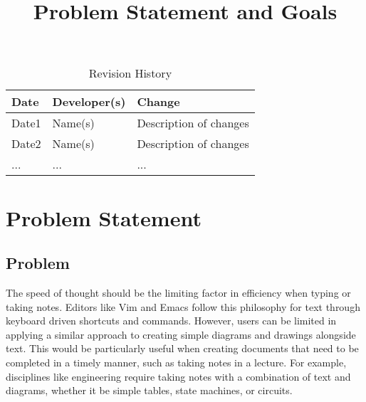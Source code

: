 \documentclass{article}
\title{Problem Statement and Goals\\\progname}
\author{\authname}
\date{}
\begin{document}
\maketitle

\begin{table}[hp]
\caption{Revision History} \label{TblRevisionHistory}
\begin{tabularx}{\textwidth}{llX}
\toprule
\textbf{Date} & \textbf{Developer(s)} & \textbf{Change}\\
\midrule
Date1 & Name(s) & Description of changes\\
Date2 & Name(s) & Description of changes\\
... & ... & ...\\
\bottomrule
\end{tabularx}
\end{table}

\section{Problem Statement}

\subsection{Problem}

The speed of thought should be the limiting factor in efficiency when typing or
taking notes. Editors like Vim and Emacs follow this philosophy for text
through keyboard driven shortcuts and commands. However, users can be limited
in applying a similar approach to creating simple diagrams and drawings
alongside text. This would be particularly useful when creating documents that
need to be completed in a timely manner, such as taking notes in a lecture. For
example, disciplines like engineering require taking notes with a combination
of text and diagrams, whether it be simple tables, state machines, or circuits.
\vspace{1em}
\end{document}
